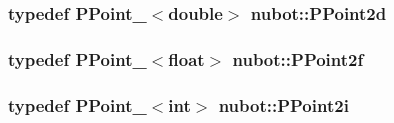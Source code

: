 \hypertarget{namespacenubot_a2b8f952f9a6ec80df0a885dbca6671f9}{
\subsubsection[{P\-Point2d}]{\setlength{\rightskip}{0pt plus 5cm}typedef {\bf P\-Point\-\_\-}$<$double$>$ {\bf nubot\-::\-P\-Point2d}}}\label{namespacenubot_a2b8f952f9a6ec80df0a885dbca6671f9}
\hypertarget{namespacenubot_a93e65a2d123526a505e4364043785072}{
\subsubsection[{P\-Point2f}]{\setlength{\rightskip}{0pt plus 5cm}typedef {\bf P\-Point\-\_\-}$<$float$>$ {\bf nubot\-::\-P\-Point2f}}}\label{namespacenubot_a93e65a2d123526a505e4364043785072}
\hypertarget{namespacenubot_a2de267f77449de1b98bfeb641671301b}{
\subsubsection[{P\-Point2i}]{\setlength{\rightskip}{0pt plus 5cm}typedef {\bf P\-Point\-\_\-}$<$int$>$ {\bf nubot\-::\-P\-Point2i}}}\label{namespacenubot_a2de267f77449de1b98bfeb641671301b}


